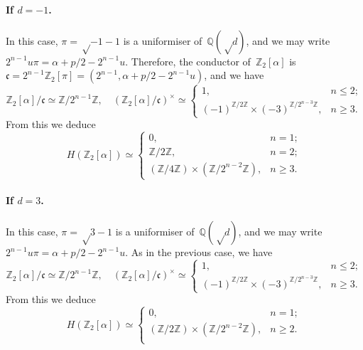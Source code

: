 \documentclass{article}
\let\fr\mathfrak
\begin{document}
\paragraph{If $d = -1$.} In this case, $π = √{-1}-1$ is a uniformiser
of~$ℚ(√{d})$, and we may write~$2^{n-1} u π = α + p/2 - 2^{n-1} u$.
Therefore, the conductor of~$ℤ_2[α]$ is~$\fr c = 2^{n-1}
ℤ_2[π] = (2^{n-1}, α+p/2-2^{n-1} u)$, and we have
\begin{equation}
ℤ_2[α]/\fr c ≃ ℤ/2^{n-1} ℤ, \quad
(ℤ_2[α]/\fr c)^{×} ≃ \begin{cases} 1,&n ≤ 2;\\
(-1)^{ℤ/2ℤ} × (-3)^{ℤ/2^{n-3} ℤ},&n ≥ 3.\end{cases}
\end{equation}
From this we deduce
\begin{equation}
H(ℤ_2[α]) ≃ \begin{cases} 0, & n = 1;\\
ℤ/2ℤ, & n = 2;\\ (ℤ/4ℤ) × (ℤ/2^{n-2}ℤ), & n ≥ 3. \end{cases}
\end{equation}

\paragraph{If $d = 3$.} In this case, $π = √{3}-1$ is a uniformiser
of~$ℚ(√{d})$, and we may write~$2^{n-1} u π = α + p/2 - 2^{n-1} u$. As in
the previous case, we have
\begin{equation}
ℤ_2[α]/\fr c ≃ ℤ/2^{n-1} ℤ, \quad
(ℤ_2[α]/\fr c)^{×} ≃ \begin{cases} 1,&n ≤ 2;\\
(-1)^{ℤ/2ℤ} × (-3)^{ℤ/2^{n-3} ℤ},&n ≥ 3.\end{cases}
\end{equation}
From this we deduce
\begin{equation}
H(ℤ_2[α]) ≃ \begin{cases} 0, & n = 1;\\
(ℤ/2ℤ) × (ℤ/2^{n-2}ℤ),& n ≥ 2.\\\end{cases}
\end{equation}
\end{document}
